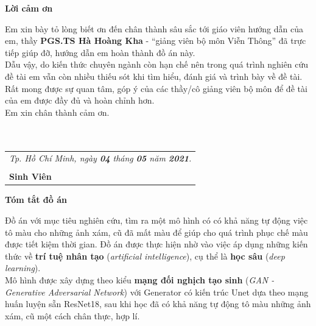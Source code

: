 \documentclass[a4paper]{article}
\begin{document}
\newpage

\begin{center}
\huge
\textbf{Lời cảm ơn}
\end{center}

\indent
Em xin bày tỏ lòng biết ơn đến chân thành sâu sắc tới giáo viên hướng dẫn của em, thầy \textbf{PGS.TS Hà Hoàng Kha} - ``giảng viên bộ môn Viễn Thông'' đã trực tiếp giúp đỡ, hướng dẫn em hoàn thành đồ án này.\\

Dẫu vậy, do kiến thức chuyên ngành còn hạn chế nên trong quá trình nghiên cứu đề tài em vẫn còn nhiều thiếu sót khi tìm hiểu, đánh giá và trình bày về đề tài. Rất mong được sự quan tâm, góp ý của các thầy/cô giảng viên bộ môn để đề tài của em được đầy đủ và hoàn chỉnh hơn.\\


Em xin chân thành cảm ơn.\\\\\\

\hfill
\begin{tabular}{l@{}}
\textit{Tp. Hồ Chí Minh, ngày \textbf{04} tháng \textbf{05} năm \textbf{2021}.}\\\\
\hspace{3cm}\textbf{Sinh Viên}
\end{tabular}

\newpage

\begin{center}
\huge
\textbf{Tóm tắt đồ án}
\end{center}

\indent
Đồ án với mục tiêu nghiên cứu, tìm ra một mô hình có có khả năng tự động việc tô màu cho những ảnh xám, cũ đã mất màu để giúp cho quá trình phục chế màu được tiết kiệm thời gian. Đồ án được thực hiện nhờ vào việc áp dụng những kiến thức về \textbf{trí tuệ nhân tạo} (\textit{artificial intelligence}), cụ thể là \textbf{học sâu} (\textit{deep learning}).\\

Mô hình được xây dựng theo kiểu \textbf{mạng đối nghịch tạo sinh} (\textit{GAN - Generative Adversarial Network}) với Generator có kiến trúc Unet dựa theo mạng huấn luyện sẵn ResNet18, sau khi học đã có khả năng tự động tô màu những ảnh xám, cũ một cách chân thực, hợp lí.

\newpage

\tableofcontents
\end{document}
